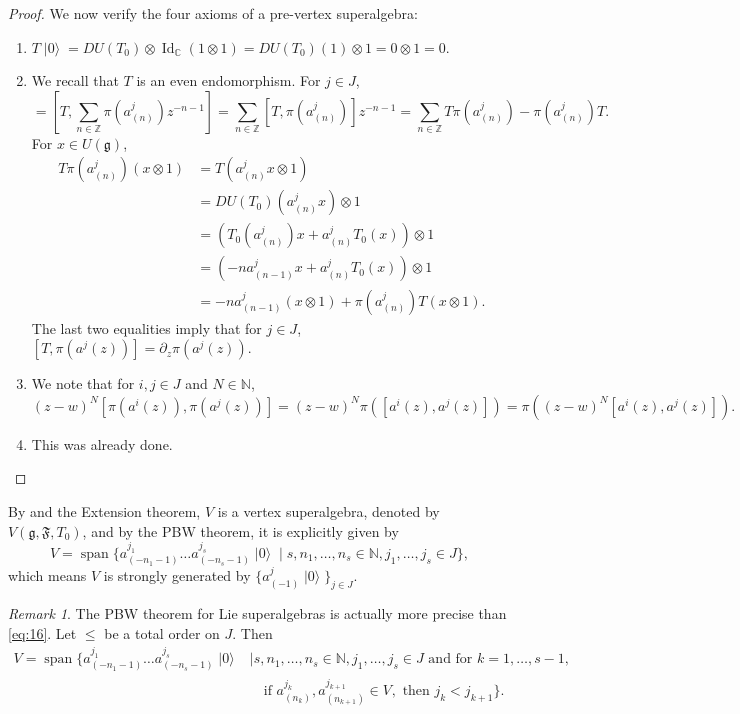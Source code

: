\documentclass[a4paper, 12pt, reqno]{amsart}
\theoremstyle{remark}
\newtheorem{remark}[theorem]{Remark}
\numberwithin{equation}{subsection}
\DeclareMathOperator{\Id}{Id}
\DeclareMathOperator{\vspan}{span}
\DeclareMathOperator{\vac}{|0\rangle}
\DeclareMathOperator{\one}{\overline{1}}
\begin{document}
\begin{proof}
  We now verify the four axioms of a pre-vertex superalgebra:
  \begin{enumerate}
  \item $T\vac = DU(T_0)\otimes\Id_{\mathbb{C}}(1\otimes1) = DU(T_0)(1)\otimes1 = 0\otimes1 = 0$.
  \item We recall that $T$ is an even endomorphism.
    For $j \in J$,
    \begin{equation*}
      [T, \pi(a^j(z))] = \left[T, \sum_{n \in \mathbb{Z}}\pi(a^j_{(n)})z^{-n - 1}\right] = \sum_{n \in \mathbb{Z}}[T, \pi(a^j_{(n)})]z^{-n - 1} = \sum_{n \in \mathbb{Z}}T\pi(a^j_{(n)}) - \pi(a^j_{(n)})T.
    \end{equation*}
    For $x \in U(\mathfrak{g})$,
    \begin{align*}
      T\pi(a^j_{(n)})(x\otimes1) &= T(a^j_{(n)}x\otimes1) \\
      &= DU(T_0)(a^j_{(n)}x)\otimes1 \\
      &= (T_0(a^j_{(n)})x + a^j_{(n)}T_0(x))\otimes1 \\
      &= (-na^j_{(n - 1)}x + a^j_{(n)}T_0(x))\otimes1 \\
      &= -na^j_{(n - 1)}(x\otimes1) + \pi(a^j_{(n)})T(x\otimes 1).
    \end{align*}
    The last two equalities imply that for $j \in J$, $[T, \pi(a^j(z))] = \partial_z\pi(a^j(z))$.
  \item We note that for $i, j \in J$ and $N \in \mathbb{N}$,
    \begin{equation*}
      (z - w)^N[\pi(a^i(z)), \pi(a^j(z))] = (z - w)^N\pi([a^i(z), a^j(z)]) = \pi((z - w)^N[a^i(z), a^j(z)]).
    \end{equation*}
  \item This was already done. \qedhere
  \end{enumerate}
\end{proof}

By  and the Extension theorem, $V$ is a vertex superalgebra, denoted by $V(\mathfrak{g}, \mathfrak{F}, T_0)$, and by the PBW theorem, it is explicitly given by
\begin{equation}
  \label{eq:16}
  V = \vspan\{a^{j_1}_{(-n_1 - 1)}\dots a^{j_s}_{(-n_s - 1)}\vac \mid s, n_1, \dots, n_s \in \mathbb{N}, j_1, \dots, j_s \in J\},
\end{equation}
which means $V$ is strongly generated by $\{a^j_{(-1)}\vac\}_{j \in J}$.

\begin{remark}
  \label{rmk:14}
  The PBW theorem for Lie superalgebras is actually more precise than \eqref{eq:16}.
  Let $\le$ be a total order on $J$.
  Then
  \begin{equation*}
    \begin{split}
      V = \vspan\{a^{j_1}_{(-n_1 - 1)}\dots a^{j_s}_{(-n_s - 1)}\vac &\mid s, n_1, \dots, n_s \in \mathbb{N}, j_1, \dots, j_s \in J\text{ and for } k = 1, \dots, s - 1, \\
      &\quad \text{if }a^{j_k}_{(n_k)}, a^{j_{k + 1}}_{(n_{k + 1})} \in V_{\one},\text{ then }j_k < j_{k + 1}\}.
    \end{split}
  \end{equation*}
\end{remark}
\end{document}
